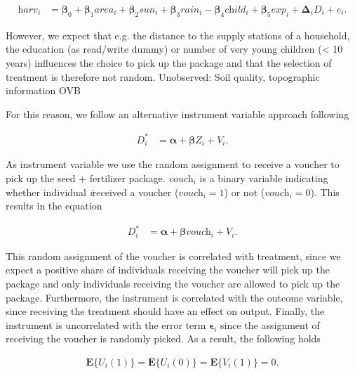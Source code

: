 \begin{align}
	\label{eq:eq1}
	\textit{harv}_i &= \boldsymbol{\beta}_0 + \boldsymbol{\beta}_1 \textit{area}_i + \boldsymbol{\beta}_2 \textit{sun}_i + \boldsymbol{\beta}_3 \textit{rain}_i - \boldsymbol{\beta}_4 \textit{child}_i + \boldsymbol{\beta}_5 \textit{exp}_i + \boldsymbol{\Delta}_i \textit{D}_i + \textit{e}_i.
\end{align}

However, we expect that e.g. the distance to the supply stations of a household, the education (as read/write dummy) or number of very young children (< 10 years) influences the choice to pick up the package and that the selection of treatment is therefore not random. Unobserved: Soil quality, topographic information OVB

For this reason, we follow an alternative instrument variable approach following 

\begin{align}
	\label{eq:eq1}
	\textit{D}_i^\ast &= \boldsymbol{\alpha} + \boldsymbol{\beta} \textit{Z}_i + \textit{V}_i.
\end{align}

As instrument variable we use the random assignment to receive a voucher to pick up the seed + fertilizer package. $\textit{vouch}_i$ is a binary variable indicating whether individual \textit{i}received a voucher ($\textit{vouch}_i = 1$) or not ($\textit{vouch}_i = 0$). This results in the equation

\begin{align}
	\label{eq:eq1}
	\textit{D}_i^\ast &= \boldsymbol{\alpha} + \boldsymbol{\beta} \textit{vouch}_i + \textit{V}_i.
\end{align}

This random assignment of the voucher is correlated with treatment, since we expect a positive share of individuals receiving the voucher will pick up the package and only individuals receiving the voucher are allowed to pick up the package. Furthermore, the instrument is correlated with the outcome variable, since receiving the treatment should have an effect on output. Finally, the instrument is uncorrelated with the error term $\boldsymbol{\epsilon}_i$ since the assignment of receiving the voucher is randomly picked. As a result, the following holds

\begin{align}
	\label{eq:eq1}
	\boldsymbol{E}\{\textit{U}_i(1)\} = \boldsymbol{E}\{\textit{U}_i(0)\} = \boldsymbol{E}\{\textit{V}_i(1)\} = 0.
\end{align}



